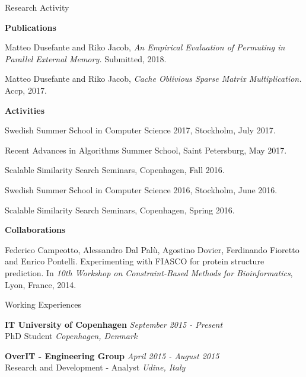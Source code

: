 \documentclass{resume} %
\begin{document}
\begin{rSection}{Research Activity}


{\bf Publications}

Matteo Dusefante and Riko Jacob, \emph{An Empirical Evaluation of Permuting in Parallel External Memory.} Submitted, 2018.

Matteo Dusefante and Riko Jacob, \emph{Cache Oblivious Sparse Matrix Multiplication.} Accp, 2017.

{\bf Activities}

Swedish Summer School in Computer Science 2017, Stockholm, July 2017.

Recent Advances in Algorithms Summer School, Saint Petersburg, May 2017.

Scalable Similarity Search Seminars, Copenhagen, Fall 2016.

Swedish Summer School in Computer Science 2016, Stockholm, June 2016.

Scalable Similarity Search Seminars, Copenhagen, Spring 2016.

{\bf Collaborations}

Federico Campeotto, Alessandro Dal Palù, Agostino Dovier, Ferdinando Fioretto and Enrico Pontelli. Experimenting with FIASCO for protein structure prediction. In \emph{10th Workshop on Constraint-Based Methods for Bioinformatics}, Lyon, France, 2014.


\end{rSection}



\begin{rSection}{Working Experiences}

{\bf IT University of Copenhagen} \hfill {\em September 2015 - Present} \\ 
{ PhD Student} \hfill {\em Copenhagen, Denmark}

{\bf OverIT - Engineering Group} \hfill {\em April 2015 - August 2015} \\ 
{ Research and Development - Analyst} \hfill {\em Udine, Italy} \\

\end{rSection}

\end{document}
